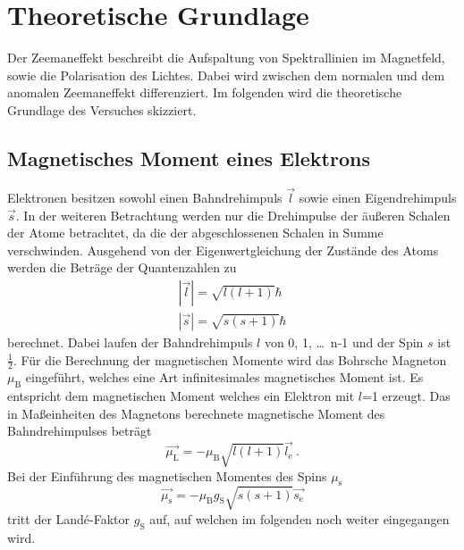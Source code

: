 \section{Theoretische Grundlage}
\label{sec:Theorie}
Der Zeemaneffekt beschreibt die Aufspaltung von Spektrallinien im Magnetfeld, sowie die Polarisation des Lichtes. Dabei wird zwischen dem normalen und dem anomalen Zeemaneffekt differenziert. Im folgenden wird die theoretische Grundlage des Versuches skizziert.

\subsection{Magnetisches Moment eines Elektrons}
Elektronen besitzen sowohl einen Bahndrehimpuls $\vec{l}$ sowie einen Eigendrehimpuls $\vec{s}$. In der weiteren Betrachtung werden nur die Drehimpulse der äußeren Schalen der Atome betrachtet, da die der abgeschlossenen Schalen in Summe verschwinden. Ausgehend von der Eigenwertgleichung der Zustände des Atoms werden die Beträge der Quantenzahlen zu
\begin{eqnarray}
  |\vec{l}| = \sqrt{l(l+1)} \hbar  \\
  |\vec{s}| = \sqrt{s(s+1)} \hbar
  \label{eqn:betQua}
\end{eqnarray}
berechnet. Dabei laufen der Bahndrehimpuls $l$ von 0, 1, \ldots $\,$ n-1 und der Spin $s$ ist $\frac{1}{2}$. Für die Berechnung der magnetischen Momente wird das Bohrsche Magneton $\mu_\text{B}$ eingeführt, welches eine Art infinitesimales magnetisches Moment ist. Es entspricht dem magnetischen Moment welches ein Elektron mit $l$=1 erzeugt. Das in Maßeinheiten des Magnetons berechnete magnetische Moment des Bahndrehimpulses beträgt
\begin{equation}
  \vec{\mu_\text{L}} = -\mu_\text{B} \sqrt{l(l+1)} \vec{l_\text{e}} \ .
  \label{eqn:magL}
\end{equation}
Bei der Einführung des magnetischen Momentes des Spins $\mu_\text{s}$
\begin{equation}
  \vec{\mu_\text{s}} = - \mu_\text{B} g_\text{S} \sqrt{s(s+1)} \vec{s_\text{e}}
  \label{eqn:magS}
\end{equation}
tritt der Landé-Faktor $g_\text{S}$ auf, auf welchen im folgenden noch weiter eingegangen wird.

